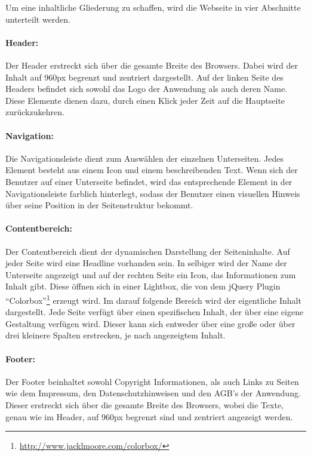Um eine inhaltliche Gliederung zu schaffen, wird die Webseite in vier Abschnitte unterteilt werden.

\paragraph{Header:}
Der Header erstreckt sich über die gesamte Breite des Browsers.
Dabei wird der Inhalt auf 960px begrenzt und zentriert dargestellt.
Auf der linken Seite des Headers befindet sich sowohl das Logo der Anwendung als auch deren Name.
Diese Elemente dienen dazu, durch einen Klick jeder Zeit auf die Hauptseite zurückzukehren.

\paragraph{Navigation:}
Die Navigationsleiste dient zum Auswählen der einzelnen Unterseiten.
Jedes Element besteht aus einem Icon und einem beschreibenden Text.
Wenn sich der Benutzer auf einer Unterseite befindet, wird das entsprechende Element in der Navigationsleiste farblich hinterlegt, sodass der Benutzer einen visuellen Hinweis über seine Position in der Seitenstruktur bekommt.

\paragraph{Contentbereich:}
Der Contentbereich dient der dynamischen Darstellung der Seiteninhalte.
Auf jeder Seite wird eine Headline vorhanden sein.
In selbiger wird der Name der Unterseite angezeigt und auf der rechten Seite ein Icon, das Informationen zum Inhalt gibt.
Diese öffnen sich in einer Lightbox, die von dem jQuery Plugin "`Colorbox"'\footnote{\url{http://www.jacklmoore.com/colorbox/}} erzeugt wird.
Im darauf folgende Bereich wird der eigentliche Inhalt dargestellt.
Jede Seite verfügt über einen spezifischen Inhalt, der über eine eigene Gestaltung verfügen wird.
Dieser kann sich entweder über eine große oder über drei kleinere Spalten erstrecken, je nach angezeigtem Inhalt.

\paragraph{Footer:}
Der Footer beinhaltet sowohl Copyright Informationen, als auch Links zu Seiten wie dem Impressum, den Datenschutzhinweisen und den AGB's der Anwendung.
Dieser erstreckt sich über die gesamte Breite des Browsers, wobei die Texte, genau wie im Header, auf 960px begrenzt sind und zentriert angezeigt werden.
